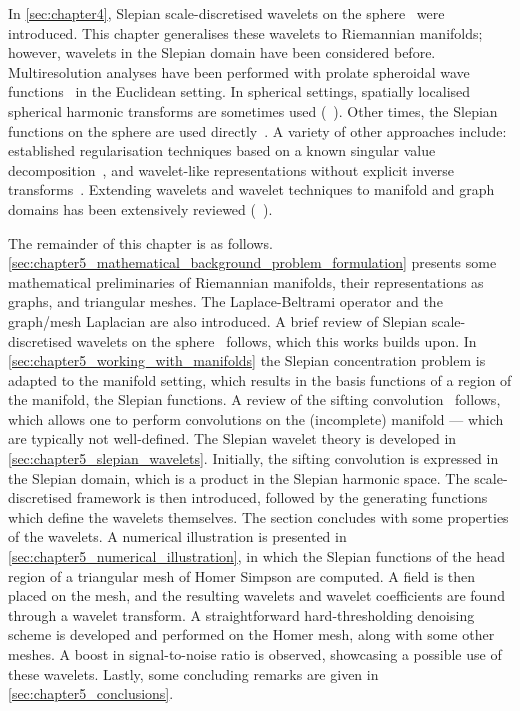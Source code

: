 In \cref{sec:chapter4}, Slepian scale-discretised wavelets on the sphere~\cite{Roddy2021a} were introduced.
This chapter generalises these wavelets to Riemannian manifolds; however, wavelets in the Slepian domain have been considered before.
Multiresolution analyses have been performed with prolate spheroidal wave functions~\cite{Walter2004} in the Euclidean setting.
In spherical settings, spatially localised spherical harmonic transforms are sometimes used (\eg{}~\cite{Simons1997,Wieczorek2005,Khalid2013,Khalid2013a}).
Other times, the Slepian functions on the sphere are used directly~\cite{Simons2009}.
A variety of other approaches include: established regularisation techniques based on a known singular value decomposition~\cite{Michel2017}, and wavelet-like representations without explicit inverse transforms~\cite{Simons2011}.
Extending wavelets and wavelet techniques to manifold and graph domains has been extensively reviewed (\eg{}~\cite{Dahmen1999,Coifman2006a}).

The remainder of this chapter is as follows.
\cref{sec:chapter5_mathematical_background_problem_formulation} presents some mathematical preliminaries of Riemannian manifolds, their representations as graphs, and triangular meshes.
The Laplace-Beltrami operator and the graph/mesh Laplacian are also introduced.
A brief review of Slepian scale-discretised wavelets on the sphere~\cite{Roddy2021a} follows, which this works builds upon.
In \cref{sec:chapter5_working_with_manifolds} the Slepian concentration problem is adapted to the manifold setting, which results in the basis functions of a region of the manifold, \ie{} the Slepian functions.
A review of the sifting convolution~\cite{Roddy2021} follows, which allows one to perform convolutions on the (incomplete) manifold --- which are typically not well-defined.
The Slepian wavelet theory is developed in \cref{sec:chapter5_slepian_wavelets}.
Initially, the sifting convolution is expressed in the Slepian domain, which is a product in the Slepian harmonic space.
The scale-discretised framework is then introduced, followed by the generating functions which define the wavelets themselves.
The section concludes with some properties of the wavelets.
A numerical illustration is presented in \cref{sec:chapter5_numerical_illustration}, in which the Slepian functions of the head region of a triangular mesh of Homer Simpson are computed.
A field is then placed on the mesh, and the resulting wavelets and wavelet coefficients are found through a wavelet transform.
A straightforward hard-thresholding denoising scheme is developed and performed on the Homer mesh, along with some other meshes.
A boost in signal-to-noise ratio is observed, showcasing a possible use of these wavelets.
Lastly, some concluding remarks are given in \cref{sec:chapter5_conclusions}.

